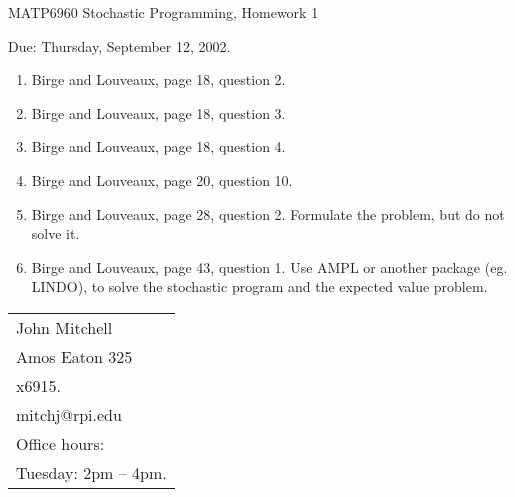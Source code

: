 \documentclass[12pt]{article}
\begin{document}
\begin{center}
  \begin{large}
     MATP6960 Stochastic Programming, Homework 1
  \end{large}
\end{center}

\begin{flushright}
   Due:  Thursday, September 12, 2002.
\end{flushright}

\vspace{\baselineskip}


\begin{enumerate}
\item Birge and Louveaux, page 18, question 2.
\item Birge and Louveaux, page 18, question 3.
\item Birge and Louveaux, page 18, question 4.
\item Birge and Louveaux, page 20, question 10.
\item Birge and Louveaux, page 28, question 2.
Formulate the problem, but do not solve it.
\item Birge and Louveaux, page 43, question 1.
Use AMPL or another package (eg. LINDO), to solve
the stochastic program and the expected value problem.
\end{enumerate}

\vfill

\begin{tabular}{@{\hspace{.5in}}l}
   John Mitchell  \\
   Amos Eaton 325  \\
   x6915.  \\
   mitchj@rpi.edu  \\
   Office hours:  \\
   Tuesday: 2pm -- 4pm.
\end{tabular}
\end{document}
